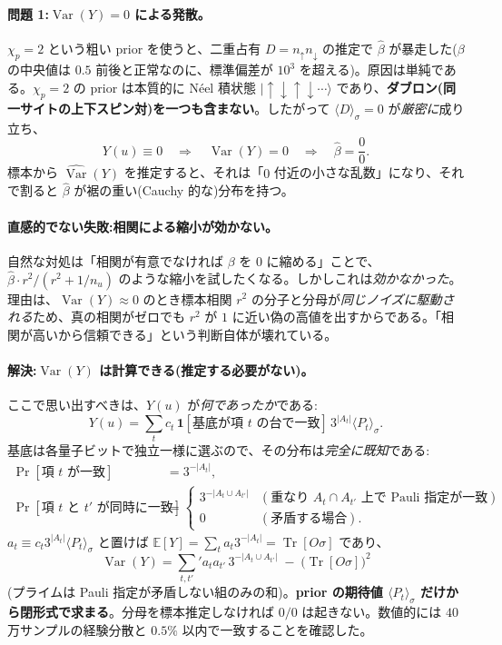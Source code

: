 \documentclass[11pt,a4paper]{ltjsarticle}
\newcommand{\ket}[1]{|#1\rangle}
\newcommand{\ev}[1]{\langle #1\rangle}
\newcommand{\Tr}{\operatorname{Tr}}
\newcommand{\Var}{\operatorname{Var}}
\begin{document}
\paragraph{問題 1:$\Var(Y)=0$ による発散。}
$\chi_p=2$ という粗い prior を使うと、二重占有 $D=n_\uparrow n_\downarrow$ の推定で $\hat\beta$ が暴走した($\beta$ の中央値は $0.5$ 前後と正常なのに、標準偏差が $10^3$ を超える)。原因は単純である。$\chi_p=2$ の prior は本質的に N\'eel 積状態 $\ket{\uparrow\downarrow\uparrow\downarrow\cdots}$ であり、\textbf{ダブロン(同一サイトの上下スピン対)を一つも含まない}。したがって $\ev{D}_\sigma=0$ が\emph{厳密に}成り立ち、
\begin{equation}
  Y(u) \equiv 0 \quad\Longrightarrow\quad \Var(Y)=0 \quad\Longrightarrow\quad \hat\beta = \frac{0}{0}.
\end{equation}
標本から $\widehat{\Var}(Y)$ を推定すると、それは「$0$ 付近の小さな乱数」になり、それで割ると $\hat\beta$ が裾の重い(Cauchy 的な)分布を持つ。

\paragraph{直感的でない失敗:相関による縮小が効かない。}
自然な対処は「相関が有意でなければ $\beta$ を $0$ に縮める」ことで、$\hat\beta\cdot r^2/(r^2+1/n_u)$ のような縮小を試したくなる。しかしこれは\emph{効かなかった}。理由は、$\Var(Y)\approx0$ のとき標本相関 $r^2$ の分子と分母が\emph{同じノイズに駆動される}ため、真の相関がゼロでも $r^2$ が $1$ に近い偽の高値を出すからである。「相関が高いから信頼できる」という判断自体が壊れている。

\paragraph{解決:$\Var(Y)$ は計算できる(推定する必要がない)。}
ここで思い出すべきは、$Y(u)$ が\emph{何であったか}である:
\begin{equation}
  Y(u)=\sum_t c_t\,\mathbf 1[\text{基底が項 }t\text{ の台で一致}]\,3^{|A_t|}\ev{P_t}_\sigma .
\end{equation}
基底は各量子ビットで独立一様に選ぶので、その分布は\emph{完全に既知}である:
\begin{align}
  \Pr[\text{項 }t\text{ が一致}] &= 3^{-|A_t|},\\
  \Pr[\text{項 }t\text{ と }t'\text{ が同時に一致}] &=
  \begin{cases}
    3^{-|A_t\cup A_{t'}|} & (\text{重なり }A_t\cap A_{t'}\text{ 上で Pauli 指定が一致}),\\
    0 & (\text{矛盾する場合}).
  \end{cases}
\end{align}
$a_t\equiv c_t 3^{|A_t|}\ev{P_t}_\sigma$ と置けば $\mathbb E[Y]=\sum_t a_t 3^{-|A_t|}=\Tr[O\sigma]$ であり、
\begin{equation}
  \boxed{\ \Var(Y)=\sum_{t,t'}{}' a_t a_{t'}\,3^{-|A_t\cup A_{t'}|} \;-\;\bigl(\Tr[O\sigma]\bigr)^2\ }
\end{equation}
(プライムは Pauli 指定が矛盾しない組のみの和)。\textbf{prior の期待値 $\ev{P_t}_\sigma$ だけから閉形式で求まる}。分母を標本推定しなければ $0/0$ は起きない。数値的には $40$ 万サンプルの経験分散と $0.5\%$ 以内で一致することを確認した。
\end{document}
